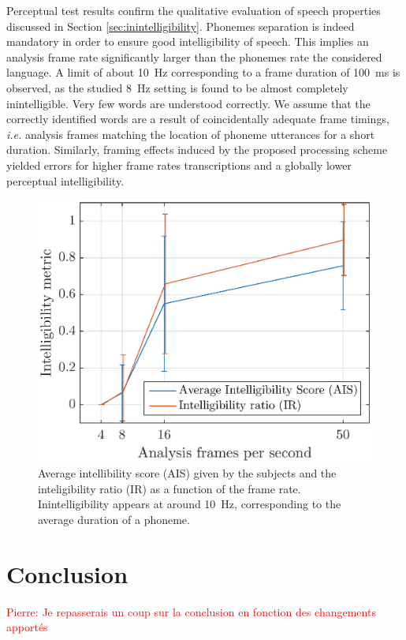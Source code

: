 \documentclass[final,3p,times,twocolumn]{elsarticle}
\newcommand{\pa}[1]{\textcolor{red}{ Pierre: #1}}
\begin{document}
Perceptual test results confirm the qualitative evaluation of speech properties discussed in Section \ref{sec:inintelligibility}. Phonemes separation is indeed mandatory in order to ensure good intelligibility of speech. This implies an analysis frame rate significantly larger than the phonemes rate the considered language. A limit of about 10~Hz corresponding to a frame duration of 100~ms is observed, as the studied 8~Hz setting is found to be almost completely inintelligible. Very few words are understood correctly. We assume that the correctly identified words are a result of coincidentally adequate frame timings, \textit{i.e.} analysis frames matching the location of phoneme utterances for a short duration. Similarly, framing effects induced by the proposed processing scheme yielded errors for higher frame rates transcriptions and a globally lower perceptual intelligibility.\\


\begin{figure}[htbp]
	\centering
		\includegraphics[width=\columnwidth]{figures/subj_int.eps}
	\caption{Average intellibility score (AIS) given by the subjects and the inteligibility ratio (IR) as a function of the frame rate. Inintelligibility appears at around 10~Hz, corresponding to the average duration of a phoneme.}
	\label{fig:subj_int}
\end{figure}

\section{Conclusion}
\pa{Je repasserais un coup sur la conclusion en fonction des changements apportés}
\end{document}
